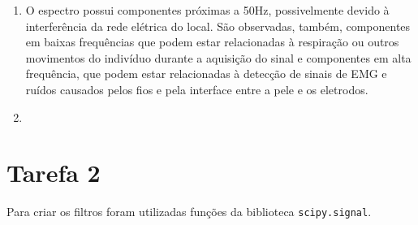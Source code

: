 \documentclass[12pt,letterpaper]{article}
\begin{document}
\begin{enumerate}[label=(\alph*)]
    \item
    O espectro possui componentes próximas a 50Hz, possivelmente devido à interferência da rede elétrica do local. São observadas, também, componentes em baixas frequências que podem estar relacionadas à respiração ou outros movimentos do indivíduo durante a aquisição do sinal e componentes em alta frequência, que podem estar relacionadas à detecção de sinais de EMG e ruídos causados pelos fios e pela interface entre a pele e os eletrodos.
    
    \item
    
    
\end{enumerate}

\section*{Tarefa 2}
Para criar os filtros foram utilizadas funções da biblioteca \lstinline{scipy.signal}.
\end{document}
